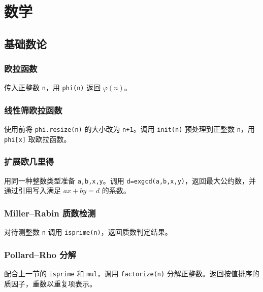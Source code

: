 \chapter{数学}

\section{基础数论}

\subsection{欧拉函数}

传入正整数 \texttt{n}，用 \texttt{phi(n)} 返回 $\varphi(n)$。


\subsection{线性筛欧拉函数}

使用前将 \texttt{phi.resize(n)} 的大小改为 \texttt{n+1}。调用 \texttt{init(n)} 预处理到正整数 \texttt{n}，用 \texttt{phi[x]} 取欧拉函数。


\subsection{扩展欧几里得}

用同一种整数类型准备 \texttt{a,b,x,y}。调用 \texttt{d=exgcd(a,b,x,y)}，返回最大公约数，并通过引用写入满足 $ax+by=d$ 的系数。


\subsection{Miller--Rabin 质数检测}

对待测整数 \texttt{n} 调用 \texttt{isprime(n)}，返回质数判定结果。


\subsection{Pollard--Rho 分解}

配合上一节的 \texttt{isprime} 和 \texttt{mul}，调用 \texttt{factorize(n)} 分解正整数。返回按值排序的质因子，重数以重复项表示。


